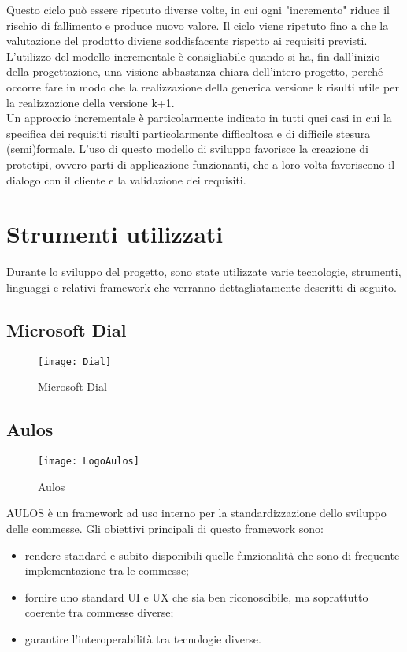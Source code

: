 Questo ciclo può essere ripetuto diverse volte, in cui ogni "incremento" riduce il rischio di fallimento e produce nuovo valore. Il ciclo viene ripetuto fino a che la valutazione del prodotto diviene soddisfacente rispetto ai requisiti previsti.\\

L'utilizzo del modello incrementale è consigliabile quando si ha, fin dall'inizio della progettazione, una visione abbastanza chiara dell'intero progetto, perché occorre fare in modo che la realizzazione della generica versione k risulti utile per la realizzazione della versione k+1.\\

Un approccio incrementale è particolarmente indicato in tutti quei casi in cui la specifica dei requisiti risulti particolarmente difficoltosa e di difficile stesura (semi)formale. L'uso di questo modello di sviluppo favorisce la creazione di prototipi, ovvero parti di applicazione funzionanti, che a loro volta favoriscono il dialogo con il cliente e la validazione dei requisiti.

\section{Strumenti utilizzati}

Durante lo sviluppo del progetto, sono state utilizzate varie tecnologie, strumenti, linguaggi e relativi framework che verranno dettagliatamente descritti di seguito.


\subsection{Microsoft Dial}
\begin{figure}[htpb!]
\center
  \texttt{[image: Dial]}
  \caption{Microsoft Dial}
\end{figure}
\subsection{Aulos}
\begin{figure}[htpb!]
\center
  \texttt{[image: LogoAulos]}
  \caption{Aulos}
\end{figure}
AULOS è un framework ad uso interno per la standardizzazione dello sviluppo delle commesse.
Gli obiettivi principali di questo framework sono:
\begin{itemize}
\item rendere standard e subito disponibili quelle funzionalità che sono di frequente implementazione tra le commesse;
\item fornire uno standard UI e UX che sia ben riconoscibile, ma soprattutto coerente tra commesse diverse;
\item garantire l’interoperabilità tra tecnologie diverse.
\end{itemize}

